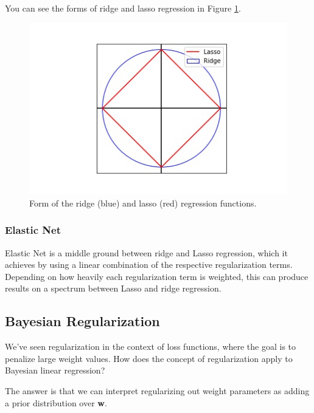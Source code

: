 You can see the forms of ridge and lasso regression in Figure \ref{fig:ridge-and-lasso-reg-fn-form}.

\begin{figure}
    \centering
    \includegraphics[width=0.5\paperwidth]{../LinearRegression/fig/ridgeandlassoreg_GEN.jpg}
    \caption{Form of the ridge (blue) and lasso (red) regression functions.}
    \label{fig:ridge-and-lasso-reg-fn-form}
\end{figure}

\subsubsection{Elastic Net}
Elastic Net is a middle ground between ridge and Lasso regression, which it achieves by using a linear combination of the respective regularization terms. Depending on how heavily each regularization term is weighted, this can produce results on a spectrum between Lasso and ridge regression. \\

\subsection{Bayesian Regularization} \label{bayesian-regularization-section}
We've seen regularization in the context of loss functions, where the goal is to penalize large weight values. How does the concept of regularization apply to Bayesian linear regression?

The answer is that we can interpret regularizing out weight parameters as adding a prior distribution over \textbf{w}.

